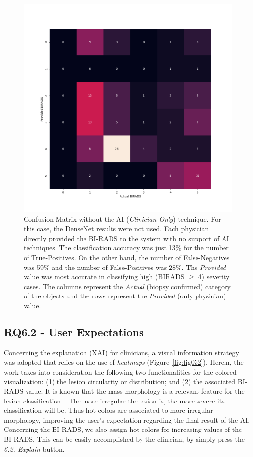\begin{figure}[htbp]
\centering
\includegraphics[width=\textwidth]{images/fig044}
\caption{Confusion Matrix without the AI ({\it Clinician-Only}) technique. For this case, the DenseNet results were not used. Each physician directly provided the BI-RADS to the system with no support of AI techniques. The classification accuracy was just 13\% for the number of True-Positives. On the other hand, the number of False-Negatives was 59\% and the number of False-Positives was 28\%. The {\it Provided} value was most accurate in classifying high (BIRADS $\ge$ 4) severity cases. The columns represent the {\it Actual} (biopsy confirmed) category of the objects and the rows represent the {\it Provided} (only physician) value.}
\label{fig:fig044}
\end{figure}

\subsection{RQ6.2 - User Expectations}
\label{sec:sec006006002}

Concerning the explanation (\ac{XAI}) for clinicians, a visual information strategy was adopted that relies on the use of {\it heatmaps} (Figure~\ref{fig:fig032}).
Herein, the work takes into consideration the following two functionalities for the colored-visualization:
(1) the lesion circularity or distribution; and
(2) the associated \ac{BI-RADS} value.
It is known that the mass morphology is a relevant feature for the lesion classification~\cite{maicas2018training}.
The more irregular the lesion is, the more severe its classification will be.
Thus hot colors are associated to more irregular morphology, improving the user's expectation regarding the final result of the \ac{AI}.
Concerning the \ac{BI-RADS}, we also assign hot colors for increasing values of the \ac{BI-RADS}. 
This can be easily accomplished by the clinician, by simply press the {\it 6.2. Explain} button.

